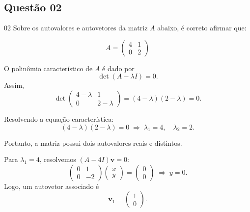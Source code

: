 \subsection*{Questão 02}

\begin{questionbox}{02} 
  Sobre os autovalores e autovetores da matriz $A$ abaixo, é correto afirmar que:

  \[
  A = \begin{pmatrix}
  4 & 1 \\
  0 & 2
  \end{pmatrix}
  \]
\end{questionbox}

\begin{solutionbox}
  O polinômio característico de $A$ é dado por
  \[
  \det(A - \lambda I) = 0.
  \]
  Assim,
  \[
  \det \begin{pmatrix}
  4 - \lambda & 1 \\
  0 & 2 - \lambda
  \end{pmatrix}
  = (4 - \lambda)(2 - \lambda) = 0.
  \]
\end{solutionbox}

\begin{solutionbox}
  Resolvendo a equação característica:
  \[
  (4 - \lambda)(2 - \lambda) = 0
  \;\Rightarrow\;
  \lambda_1 = 4, \quad \lambda_2 = 2.
  \]

  Portanto, a matriz possui dois autovalores reais e distintos.
\end{solutionbox}

\begin{solutionbox}
  Para $\lambda_1 = 4$, resolvemos $(A - 4I)\mathbf{v} = 0$:
  \[
  \begin{pmatrix}
  0 & 1 \\
  0 & -2
  \end{pmatrix}
  \begin{pmatrix}
  x \\ y
  \end{pmatrix}
  =
  \begin{pmatrix}
  0 \\ 0
  \end{pmatrix}
  \;\Rightarrow\; y = 0.
  \]
  Logo, um autovetor associado é
  \[
  \mathbf{v}_1 = \begin{pmatrix}1 \\ 0\end{pmatrix}.
  \]
\end{solutionbox}

